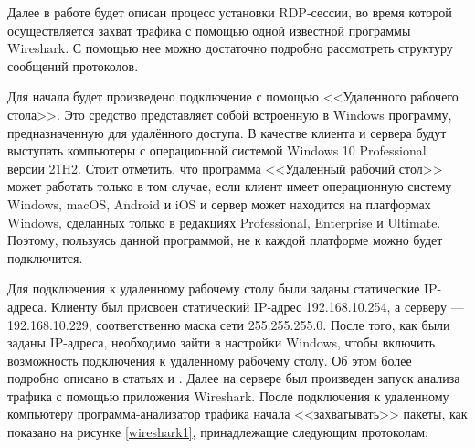 \documentclass[bachelor, och, coursework]{SCWorks}
\begin{document}
  
  Далее в работе будет описан процесс установки RDP-сессии, во время которой осуществляется захват трафика с помощью одной известной программы Wireshark. С помощью нее
  можно достаточно подробно рассмотреть структуру сообщений протоколов.

  Для начала будет произведено подключение с помощью <<Удаленного рабочего стола>>. Это средство представляет собой встроенную в Windows программу, предназначенную
  для удалённого доступа. В качестве клиента и сервера будут выступать компьютеры с операционной системой Windows 10 Professional версии 21H2. Стоит отметить, что
  программа <<Удаленный рабочий стол>> может работать только в том случае, если клиент имеет операционную систему Windows, macOS, Android и iOS и 
  сервер может находится на платформах Windows, сделанных только в редакциях Professional, Enterprise и Ultimate. Поэтому, пользуясь данной программой, 
  не к каждой платформе можно будет подключится.
  
  Для подключения к удаленному рабочему столу были заданы статические IP-адреса. Клиенту был присвоен статический IP-адрес 192.168.10.254,
  а серверу --- 192.168.10.229, соответственно маска сети 255.255.255.0. После того, как были заданы IP-адреса, необходимо зайти в настройки
  Windows, чтобы включить возможность подключения к удаленному рабочему столу. Об этом более подробно описано
  в статьях \cite{userdp1} и \cite{userdp2}. Далее на сервере был произведен запуск анализа трафика с помощью приложения Wireshark.
  После подключения к удаленному компьютеру программа-анализатор трафика начала <<захватывать>> пакеты, как показано на рисунке \ref{wireshark1},
  принадлежащие следующим протоколам:
  
\end{document}
